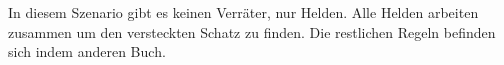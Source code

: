 

In diesem Szenario gibt es keinen Verräter, nur Helden.
Alle Helden arbeiten zusammen um den versteckten Schatz zu finden.
Die restlichen Regeln befinden sich indem anderen Buch.
